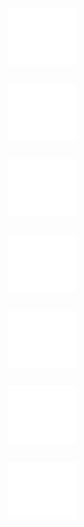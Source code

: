 \documentclass{article}
\begin{document}
\includegraphics[width=18mm]{Blank.jpg}
\par
\textbf{}
\vspace{1cm}

\includegraphics[width=18mm]{Blank.jpg}
\par
\textbf{}
\vspace{1cm}

\includegraphics[width=18mm]{Blank.jpg}
\par
\textbf{}
\vspace{1cm}

\includegraphics[width=18mm]{Blank.jpg}
\par
\textbf{}
\vspace{1cm}

\includegraphics[width=18mm]{Blank.jpg}
\par
\textbf{}
\vspace{1cm}

\includegraphics[width=18mm]{Blank.jpg}
\par
\textbf{}
\vspace{1cm}

\includegraphics[width=18mm]{Blank.jpg}
\par
\textbf{}
\vspace{1cm}
\end{document}
